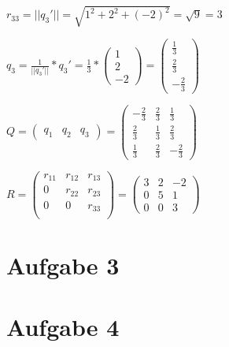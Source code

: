\documentclass[10pt,a4paper]{article}
\begin{document}
$r_{33}=||q_3'||=\sqrt{1^2+2^2+(-2)^2}=\sqrt{9}=3$

$q_3 = \frac{1}{||q_3'||}*q_3'=\frac{1}{3}*\begin{pmatrix}
    1\\
    2\\
    -2
\end{pmatrix}=\begin{pmatrix}
    \frac{1}{3}  \\
    \frac{2}{3}  \\
    -\frac{2}{3}
\end{pmatrix}$

$Q=\begin{pmatrix}
    q_1 & q_2 & q_3
\end{pmatrix}=\begin{pmatrix}
        -\frac{2}{3} & \frac{2}{3} & \frac{1}{3}  \\
        \frac{2}{3}  & \frac{1}{3} & \frac{2}{3}  \\
        \frac{1}{3}  & \frac{2}{3} & -\frac{2}{3}
    \end{pmatrix}$

$R=\begin{pmatrix}
    r_{11}&r_{12}&r_{13}\\
    0&r_{22}&r_{23}\\
    0&0&r_{33}\\
\end{pmatrix}=\begin{pmatrix}
        3 & 2 & -2 \\
        0 & 5 & 1  \\
        0 & 0 & 3
    \end{pmatrix}$


\section*{Aufgabe 3}

\section*{Aufgabe 4}

\end{document}
